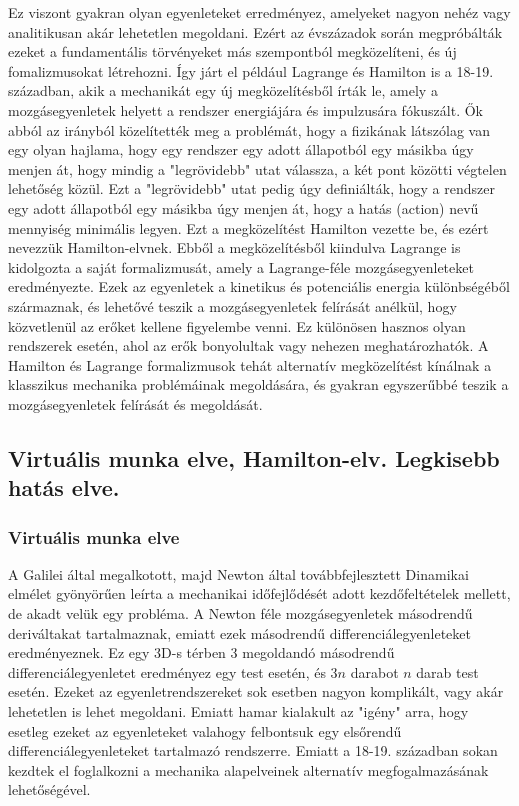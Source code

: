 \documentclass[../main.tex]{subfiles}
\begin{document}
Ez viszont gyakran olyan egyenleteket erredményez, amelyeket nagyon nehéz vagy analitikusan akár lehetetlen megoldani. Ezért az évszázadok során megpróbálták ezeket a fundamentális törvényeket más szempontból megközelíteni,
és új fomalizmusokat létrehozni. Így járt el például Lagrange és Hamilton is a 18-19. században, akik a mechanikát egy új megközelítésből írták le, amely a mozgásegyenletek helyett a rendszer energiájára és impulzusára fókuszált.
Ők abból az irányból közelítették meg a problémát, hogy a fizikának látszólag van egy olyan hajlama, hogy egy rendszer egy adott állapotból egy másikba úgy menjen át, hogy mindig a "legrövidebb" utat válassza, a két pont közötti
végtelen lehetőség közül. Ezt a "legrövidebb" utat pedig úgy definiálták, hogy a rendszer egy adott állapotból egy másikba úgy menjen át, hogy a hatás (action) nevű mennyiség minimális legyen. Ezt a megközelítést Hamilton vezette be, és ezért nevezzük Hamilton-elvnek.
Ebből a megközelítésből kiindulva Lagrange is kidolgozta a saját formalizmusát, amely a Lagrange-féle mozgásegyenleteket eredményezte. Ezek az egyenletek a kinetikus és potenciális energia különbségéből származnak, és lehetővé teszik a
mozgásegyenletek felírását anélkül, hogy közvetlenül az erőket kellene figyelembe venni. Ez különösen hasznos olyan rendszerek esetén, ahol az erők bonyolultak vagy nehezen meghatározhatók.
A Hamilton és Lagrange formalizmusok tehát alternatív megközelítést kínálnak a klasszikus mechanika problémáinak megoldására, és gyakran egyszerűbbé teszik a mozgásegyenletek felírását és megoldását.

\subsection{Virtuális munka elve, Hamilton-elv. Legkisebb hatás elve.}
\subsubsection{Virtuális munka elve}
A Galilei által megalkotott, majd Newton által továbbfejlesztett Dinamikai elmélet gyönyörűen leírta a mechanikai időfejlődését adott kezdőfeltételek mellett, de akadt velük egy probléma. A Newton féle mozgásegyenletek másodrendű deriváltakat tartalmaznak, emiatt ezek másodrendű differenciálegyenleteket eredményeznek. Ez egy 3D-s térben 3 megoldandó másodrendű differenciálegyenletet eredményez egy test esetén, és $3n$ darabot $n$ darab test esetén. Ezeket az egyenletrendszereket sok esetben nagyon komplikált, vagy akár lehetetlen is lehet megoldani. Emiatt hamar kialakult az "igény" arra, hogy esetleg ezeket az egyenleteket valahogy felbontsuk egy elsőrendű differenciálegyenleteket tartalmazó rendszerre. Emiatt a 18-19. században sokan kezdtek el foglalkozni a mechanika alapelveinek alternatív megfogalmazásának lehetőségével. 
\end{document}
